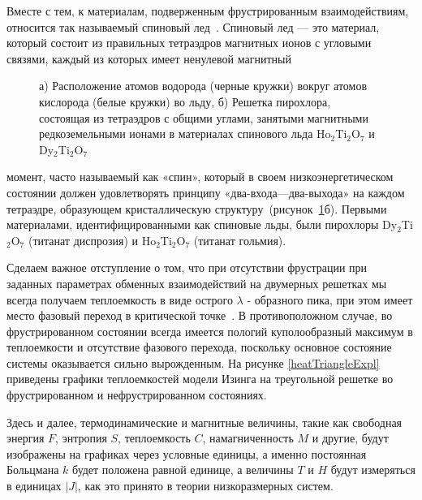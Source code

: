 Вместе с тем, к материалам, подверженным фрустрированным взаимодействиям, относится так называемый спиновый лед~\cite{diep2013,bramwell2001,kohli2011,harris1997}. Спиновый лед --- это материал, который состоит из правильных тетраэдров магнитных ионов с угловыми связями, каждый из которых имеет ненулевой магнитный

 \begin{figure}[h]
 	\begin{minipage}[h]{0.49\linewidth}
 	\end{minipage}
 	\hfill
 	\begin{minipage}[h]{0.49\linewidth}
 	\end{minipage}
 	\caption{а) Расположение атомов водорода (черные кружки) вокруг атомов кислорода (белые кружки) во льду, б) Решетка пирохлора, состоящая из тетраэдров с общими углами, занятыми магнитными редкоземельными ионами в материалах спинового льда Ho$_2$Ti$_2$O$_7$ и Dy$_2$Ti$_2$O$_7$~\cite{bramwell2001}}
 	\label{icePyroch}
 \end{figure}

\noindent момент, часто называемый как «спин», который в своем низкоэнергетическом состоянии должен удовлетворять принципу «два-входа---два-выхода» на каждом тетраэдре, образующем кристаллическую структуру~(рисунок~\ref{icePyroch}б). Первыми материалами, идентифицированными как спиновые льды, были пирохлоры Dy$_2$Ti$_2$O$_7$ (титанат диспрозия) и Ho$_2$Ti$_2$O$_7$ (титанат гольмия).

Сделаем важное отступление о том, что при отсутствии фрустрации при заданных параметрах обменных взаимодействий на двумерных решетках мы всегда получаем теплоемкость в виде острого $\lambda$ - образного пика, при этом имеет место фазовый переход в критической точке~\cite{peierls1936}. В противоположном случае, во фрустрированном состоянии всегда имеется пологий куполообразный максимум в теплоемкости и отсутствие фазового перехода, поскольку основное состояние системы оказывается сильно вырожденным. На рисунке \ref{heatTriangleExpl} приведены графики теплоемкостей модели Изинга на треугольной решетке во фрустрированном и нефрустрированном состояниях.

Здесь и далее, термодинамические и магнитные величины, такие как свободная энергия $F$, энтропия $S$, теплоемкость $C$, намагниченность $M$ и другие, будут изображены на графиках через условные единицы, а именно постоянная Больцмана $k$ будет положена равной единице, а величины $T$ и $H$ будут измеряться в единицах $|J|$, как это принято в теории низкоразмерных систем.

